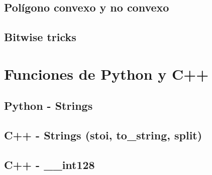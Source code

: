 \subsection{Pol\'igono convexo y no convexo}
    
\subsection{Bitwise tricks}
    

\section{Funciones de Python y C++}
\subsection{Python - Strings}
    
\subsection{C++ - Strings (stoi, to\_string, split)}
\subsection{C++ - \_\_int128}






